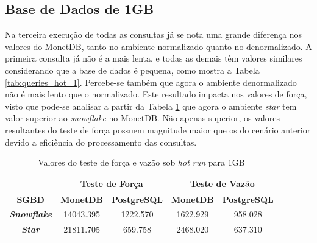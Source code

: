 \subsection{Base de Dados de 1GB}

Na terceira execução de todas as consultas já se nota uma grande diferença nos valores do MonetDB, tanto no ambiente normalizado quanto no denormalizado. A primeira consulta já não é a mais lenta, e todas as demais têm valores similares considerando que a base de dados é pequena, como mostra a Tabela \ref{tab:queries_hot_1}. Percebe-se também que agora o ambiente denormalizado não é mais lento que o normalizado. Este resultado impacta nos valores de força, visto que pode-se analisar a partir da Tabela \ref{tab:forca_vazao_hot_1} que agora o ambiente \textit{star} tem valor superior ao \textit{snowflake} no MonetDB. Não apenas superior, os valores resultantes do teste de força possuem magnitude maior que os do cenário anterior devido a eficiência do processamento das consultas.


\begin{table}[htpb]
        \centering
        \caption{Valores do teste de força e vazão sob \textit{hot run} para 1GB}
        \label{tab:forca_vazao_hot_1}
        \begin{tabular}{|c|c|c|c|c|}
        \hline
                                & \multicolumn{2}{c|}{\textbf{Teste de Força}} & \multicolumn{2}{c|}{\textbf{Teste de Vazão}} \\ \hline
        \textbf{SGBD}      & \textbf{MonetDB}    & \textbf{PostgreSQL}    & \textbf{MonetDB}    & \textbf{PostgreSQL}    \\ \hline
        \textit{\textbf{Snowflake}} & 14043.395           & 1222.570               & 1622.929            & 958.028                \\ \hline
        \textit{\textbf{Star}}      & 21811.705           & 659.758                & 2468.020            & 637.310                \\ \hline
        \end{tabular}
\end{table}

